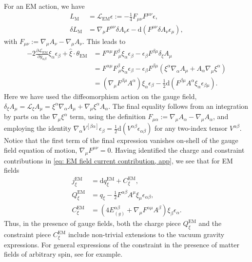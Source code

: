 \documentclass[]{jkpaper}
\theoremstyle{plain}
\theoremstyle{definition}
\newcommand{\sd}{\mathrm {d}}
\def\extd{\mathrm {d}}
\newcommand{\fd}{\delta}
\newcommand{\sL}{\mathcal{L}}
\begin{document}
For an EM action, we have
\begin{equation}\begin{split}
L_{\text{M}}&=\mathcal{L}_{\text{EM}}\epsilon:= -\frac{1}{4}F_{\mu\nu}F^{\mu\nu} \epsilon,\\
\fd L_{\text{M}}&=\nabla_\mu F^{\mu\nu}\fd A_\nu \epsilon
-\sd\left(F^{\mu\nu}\fd A_\nu \epsilon_\mu\right),
\end{split}\end{equation}
with $F_{\mu\nu}:=\nabla_\mu A_\nu-\nabla_\mu A_\nu$.
This leads to
\begin{equation}\begin{split}\label{eq: EM field current contribution, app}
-2\frac{\partial \mathcal{L}_{\text{EM}}}{\partial g_{\alpha\beta}}\xi_\alpha\epsilon_\beta
+\hat{\xi}\cdot\theta_{\text{EM}}
&=F^{\alpha\mu}F^{\beta}_{~\mu}\xi_\alpha\epsilon_\beta
-\epsilon_\beta F^{\beta\mu}\delta_\xi A_\mu\\
&=F^{\alpha\mu}F^{\beta}_{~\mu} \xi_\alpha\epsilon_\beta
-\epsilon_\beta F^{\beta\mu}(\xi^\alpha \nabla_\alpha A_\mu + A_\alpha\nabla_\mu \xi^\alpha )\\
&=(\nabla_\mu F^{\beta\mu}A^\alpha)\xi_\alpha\epsilon_\beta
-\frac{1}{2}\extd(F^{\beta\mu}A^\alpha \xi_\alpha \epsilon_{\beta\mu} ).
\end{split}\end{equation}
Here we have used the diffeomorphism action on the gauge field, $\delta_\xi A_\mu = \sL_\xi A_\mu = \xi^\alpha\nabla_\alpha A_\mu +\nabla_\mu \xi^\alpha A_\alpha$. The final equality follows from an integration by parts on the $\nabla_\mu\xi^\alpha$ term, using the definition $F_{\mu\alpha}:=\nabla_\mu A_\alpha-\nabla_\mu A_\alpha$, and employing the identity $\nabla_\alpha V^{[\beta\alpha]}\epsilon_\beta = \frac{1}{2}\extd (V^{\alpha\beta}\epsilon_{\alpha\beta})$ for any two-index tensor $V^{\alpha\beta}$.  Notice that the first term of the final expression vanishes on-shell of the gauge field equation of motion, $\nabla_\mu F^{\mu\nu}=0$.
Having identified the charge and constraint contributions in \eqref{eq: EM field current contribution, app}, we see that for EM fields
\begin{equation}\begin{split}\label{eq:resultsEM}
 j^{\text{EM}}_\xi &= \extd q^{\text{EM}}_\xi + C^{\text{EM}}_\xi,\\
 Q^{\text{EM}}_\xi &=q_\xi  -\frac{1}{2}F^{\alpha\beta}A^\mu\xi_\mu\epsilon_{\alpha\beta},\\
 C^{\text{EM}}_\xi &= \left(4 E^{\alpha\beta}_{(g)}+\nabla_\mu F^{\alpha\mu}A^\beta\right)\xi_\beta \epsilon_\alpha.
\end{split}\end{equation}
Thus, in the presence of gauge fields, both the charge piece $Q^{\text{EM}}_\xi$ and the constraint piece $C_\xi^{\text{EM}}$ include non-trivial extensions to the vacuum gravity expressions.  For general expressions of the constraint in the presence of matter fields of arbitrary spin, see \cite{Seifert:2006kv} for example.
\end{document}
